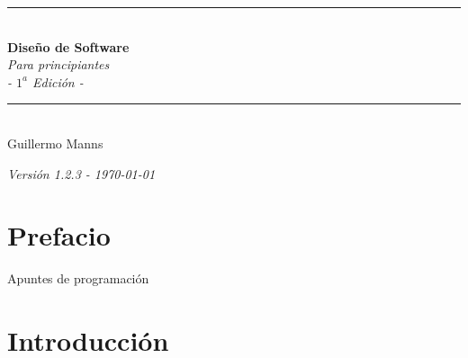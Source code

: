 \documentclass[12pt,openany]{book}
\begin{document}
\begin{titlepage}
    \begin{center}
        \vspace*{0.9cm}

        \rule{0.8\textwidth}{1.2pt}\\[0.7cm]

        {\Huge\bfseries\color{azulportada} Diseño de Software}\\[0.7cm]

        {\Large\itshape\color{azulportada} Para principiantes}\\[0.7cm]

        {\Large\itshape - $1^{a}$ Edición -}\\[0.7cm]


        \rule{0.8\textwidth}{1.2pt}\\[1cm]

        {\huge Guillermo Manns}\\[0.5cm]

        \vspace{1cm}


    \end{center}
\end{titlepage}

\renewcommand{\contentsname}{Contenido}
\tableofcontents

\newpage
\begin{center}
    \vspace{1cm}
    \textit{Versión 1.2.3 - \today}
\end{center}

\chapter*{Prefacio}
Apuntes de programación


\thispagestyle{empty}
\mbox{}
\newpage

\chapter*{Introducción}



\end{document}
